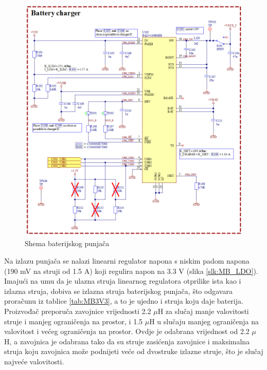 \begin{figure}[hbt]
    \centering
    \includegraphics[width = \textwidth]{Figures/MB_BATCHG.png}
    \caption{Shema baterijskog punjača}
    \label{slk:MB_BATCHG}
\end{figure}

Na izlazu punjača se nalazi linearni regulator napona s niskim padom napona (190 mV na struji od 1.5 A) koji regulira napon na 3.3 V (slika \ref{slk:MB_LDO}). Imajući na umu da je ulazna struja linearnog regulatora otprilike ista kao i izlazna struja, dobiva se izlazna struja baterijskog punjača, što odgavara proračunu iz tablice \ref{tab:MB3V3}, a to je ujedno i struja koju daje baterija. Proizvođač preporuča zavojnice vrijednosti 2.2 $\mu$H za slučaj manje valovitosti struje i manjeg ograničenja na prostor, i 1.5 $\mu$H u slučaju manjeg ograničenja na valovitost i većeg ograničenja na prostor. Ovdje je odabrana vrijednost od 2.2 $\mu$H, a zavojnica je odabrana tako da su struje zasićenja zavojnice i maksimalna struja koju zavojnica može podnijeti veće od dvostruke izlazne struje, što je slučaj najveće valovitosti.

